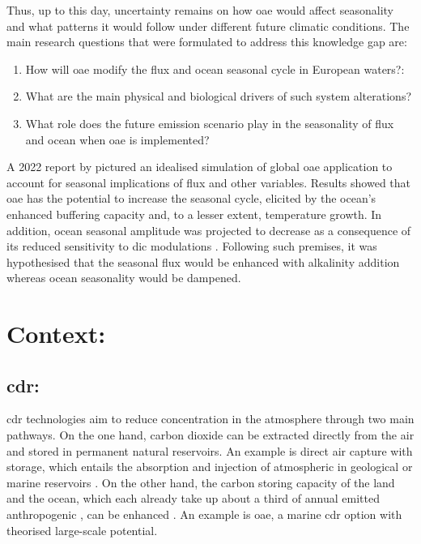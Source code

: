 Thus, up to this day, uncertainty remains on how \ac{oae} would affect  seasonality and what patterns it would follow under different future climatic conditions. The main research questions that were formulated to address this knowledge gap are:
\begin{enumerate}

  \item How will \ac{oae} modify the  flux and ocean  seasonal cycle in European waters?:
  \item What are the main physical and biological drivers of such system alterations?
  \item What role does the future emission scenario play in the seasonality of  flux and ocean  when \ac{oae} is implemented?
  
\end{enumerate}

A 2022 report by \cite{schwinger2022report} pictured an idealised simulation of global \ac{oae} application to account for seasonal implications of  flux and other variables. Results showed that \ac{oae} has the potential to increase the  seasonal cycle, elicited by the ocean's enhanced buffering capacity and, to a lesser extent, temperature growth. In addition, ocean  seasonal amplitude was projected to decrease as a consequence of its reduced sensitivity to \ac{dic} modulations \citep{schwinger2022report}. Following such premises, it was hypothesised that the  seasonal flux would be enhanced with alkalinity addition whereas ocean  seasonality would be dampened. 

\chapter{Context:} 

\section{\ac{cdr}:}

\acl{cdr} technologies aim to reduce  concentration in the atmosphere through two main pathways. On the one hand, carbon dioxide can be extracted directly from the air and stored in permanent natural reservoirs. An example is direct air capture with  storage, which entails the absorption and injection of atmospheric  in geological or marine reservoirs \citep{pires2011recent}. On the other hand, the carbon storing capacity of the land and the ocean, which each already take up about a third of annual emitted anthropogenic , can be enhanced \citep{keller2018effects}. An example is \ac{oae}, a marine \ac{cdr} option with theorised large-scale potential.

